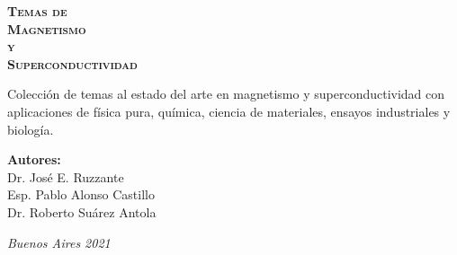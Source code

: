 \documentclass[
11pt, %
spanish,
singlespacing, %
parskip, %
headsepline, %
]{MastersDoctoralThesis} %
\begin{document}
\frontmatter %
\begin{titlepage}
\begin{center}


\vspace{10cm}

{\fontsize{20}{24}\selectfont \textsc{\bfseries Temas de}} 
\vspace{4.0cm} \\ 
{\fontsize{35}{37}\selectfont \textsc{\bfseries Magnetismo }}
\vspace{30px} \\ 
{\fontsize{37}{37}\selectfont \textsc{\bfseries y }}
\vspace{30px}\\ 
{\fontsize{35}{37}\selectfont \textsc{\bfseries Superconductividad }}

\vspace{1.5cm}
Colección de temas al estado del arte en magnetismo y superconductividad con aplicaciones de física pura, química, ciencia de materiales, ensayos industriales y biología. 

\vspace{1.5cm}




\vspace{1.5cm}
\LARGE\textbf{Autores:}\\
Dr. José E. Ruzzante \\ %
Esp. Pablo Alonso Castillo \\ %
Dr. Roberto Suárez Antola \\

\vspace{4.5cm}

\large
 


\textit{Buenos Aires 2021}
\end{center}
\end{titlepage}
\end{document}
